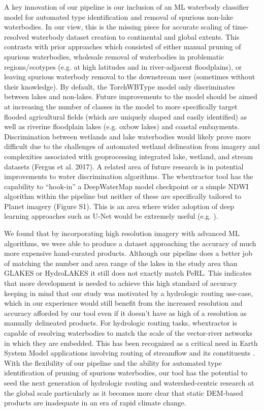 \documentclass{article}
\begin{document}
A key innovation of our pipeline is our inclusion of an ML waterbody classifier model for automated type identification and removal of spurious non-lake waterbodies. In our view, this is the missing piece for accurate scaling of time-resolved waterbody dataset creation to continental and global extents. This contrasts with prior approaches which consisted of either manual pruning of spurious waterbodies, wholesale removal of waterbodies in problematic regions/ecotypes (e.g. at high latitudes and in river-adjacent floodplains), or leaving spurious waterbody removal to the downstream user (sometimes without their knowledge). By default, the TorchWBType model only discriminates between lakes and non-lakes. Future improvements to the model should be aimed at increasing the number of classes in the model to more specifically target flooded agricultural fields (which are uniquely shaped and easily identified) as well as riverine floodplain lakes (e.g. oxbow lakes) and coastal embayments. Discrimination between wetlands and lake waterbodies would likely prove more difficult due to the challenges of automated wetland delineation from imagery and complexities associated with geoprocessing integrated lake, wetland, and stream datasets (Fergus et al. 2017). A related area of future research is in potential improvements to water discrimination algorithms. The wbextractor tool has the capability to “hook-in” a DeepWaterMap model checkpoint or a simple NDWI algorithm \citep{gaoNDWINormalizedDifference1996} within the pipeline but neither of these are specifically tailored to Planet imagery (Figure S1). This is an area where wider adoption of deep learning approaches such as U-Net would be extremely useful (e.g. \citet{mullenUsingHighResolution2023}).

We found that by incorporating high resolution imagery with advanced ML algorithms, we were able to produce a dataset approaching the accuracy of much more expensive hand-curated products. Although our pipeline does a better job of matching the number and area range of the lakes in the study area than GLAKES or HydroLAKES it still does not exactly match PeRL. This indicates that more development is needed to achieve this high standard of accuracy keeping in mind that our study was motivated by a hydrologic routing use-case, which in our experience would still benefit from the increased resolution and accuracy afforded by our tool even if it doesn't have as high of a resolution as manually delineated products. For hydrologic routing tasks, wbextractor is capable of resolving waterbodies to match the scale of the vector-river networks in which they are embedded. This has been recognized as a critical need in Earth System Model applications involving routing of streamflow and its constituents \citep{mizukamiVectorBasedRiver2021}. With the flexibility of our pipeline and the ability for automated type identification of pruning of spurious waterbodies, our tool has the potential to seed the next generation of hydrologic routing and watershed-centric research at the global scale particularly as it becomes more clear that static DEM-based products are inadequate in an era of rapid climate change.
\end{document}
